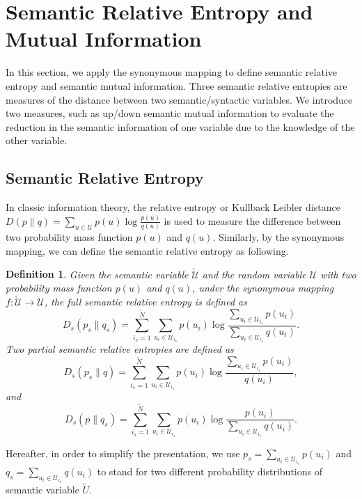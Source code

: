 \documentclass[12pt, draftclsnofoot,onecolumn]{IEEEtran}
\newtheorem{definition}{\bf{Definition}}
\begin{document}
\section{Semantic Relative Entropy and Mutual Information}
\label{section_IV}
In this section, we apply the synonymous mapping to define semantic relative entropy and semantic mutual information. Three semantic relative entropies are measures of the distance between two semantic/syntactic variables. We introduce two measures, such as up/down semantic mutual information to evaluate the reduction in the semantic information of one variable due to the knowledge of the other variable.
\subsection{Semantic Relative Entropy}
In classic information theory, the relative entropy or Kullback Leibler distance $D\left(p\|q\right)=\sum_{u\in\mathcal{U}}p(u)\log\frac{p(u)}{q(u)}$ is used to measure the difference between two probability mass function $p(u)$ and $q(u)$. Similarly, by the synonymous mapping, we can define the semantic relative entropy as following.

\begin{definition}
Given the semantic variable $\tilde {\mathcal{U}}$ and the random variable $\mathcal{U}$ with two probability mass function $p(u)$ and $q(u)$, under the synonymous mapping $f: \tilde {\mathcal{U}}\to  {\mathcal{U}}$, the full semantic relative entropy is defined as
\begin{equation}
D_s\left(p_s\|q_s\right)=\sum_{i_s=1}^{\tilde{N}}\sum_{u_i\in \mathcal{U}_{i_s}}p(u_i) \log \frac{\sum_{u_i\in \mathcal{U}_{i_s}} p(u_i)}{\sum_{u_i\in \mathcal{U}_{i_s}} q(u_i)}.
\end{equation}
Two partial semantic relative entropies are defined as
\begin{equation}
D_s\left(p_s\|q\right)=\sum_{i_s=1}^{\tilde{N}}\sum_{u_i\in \mathcal{U}_{i_s}}p(u_i) \log \frac{\sum_{u_i\in \mathcal{U}_{i_s}} p(u_i)}{q(u_i)},
\end{equation}
and
\begin{equation}
D_s\left(p\|q_s\right)=\sum_{i_s=1}^{\tilde{N}}\sum_{u_i\in \mathcal{U}_{i_s}}p(u_i) \log \frac{p(u_i)}{\sum_{u_i\in \mathcal{U}_{i_s}} q(u_i)}.
\end{equation}
\end{definition}
Hereafter, in order to simplify the presentation, we use $p_s=\sum_{u_i\in \mathcal{U}_{i_s}} p(u_i)$ and $q_s=\sum_{u_i\in \mathcal{U}_{i_s}} q(u_i)$ to stand for two different probability distributions of semantic variable $\tilde{U}$.
\end{document}
